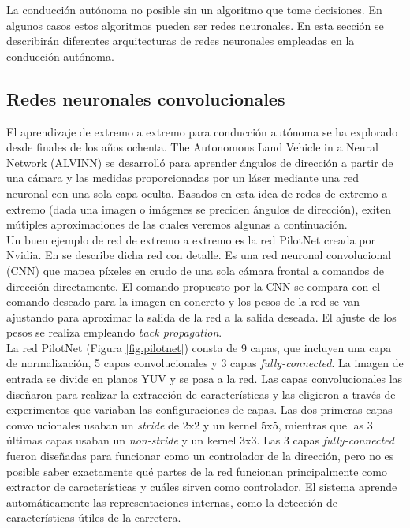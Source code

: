 La conducción autónoma no posible sin un algoritmo que tome decisiones. En algunos casos estos algoritmos pueden ser redes neuronales. En esta sección se describirán diferentes arquitecturas de redes neuronales empleadas en la conducción autónoma.


\subsection{Redes neuronales convolucionales}

El aprendizaje de extremo a extremo para conducción autónoma se ha explorado desde finales de los años ochenta. The Autonomous Land Vehicle in a Neural Network (ALVINN) \cite{alvinn} se desarrolló para aprender ángulos de dirección a partir de una cámara y las medidas proporcionadas por un láser mediante una red neuronal con una sola capa oculta. Basados en esta idea de redes de extremo a extremo (dada una imagen o imágenes se preciden ángulos de dirección), exiten mútiples aproximaciones \cite{road} \cite{end2end} \cite{interpretable} de las cuales veremos algunas a continuación.\\

Un buen ejemplo de red de extremo a extremo es la red PilotNet \cite{end2end} \cite{explaining-end2end} creada por Nvidia. En \cite{end2end} se describe dicha red con detalle. Es una red neuronal convolucional (CNN) que mapea píxeles en crudo de una sola cámara frontal a comandos de dirección directamente. El comando propuesto por la CNN se compara con el comando deseado para la imagen en concreto y los pesos de la red se van ajustando para aproximar la salida de la red a la salida deseada. El ajuste de los pesos se realiza empleando \textit{back propagation}.\\

La red PilotNet (Figura \ref{fig.pilotnet}) consta de 9 capas, que incluyen una capa de normalización, 5 capas convolucionales y 3 capas \textit{fully-connected}. La imagen de entrada se divide en planos YUV y se pasa a la red. Las capas convolucionales las diseñaron para realizar la extracción de características y las eligieron a través de experimentos que variaban las configuraciones de capas. Las dos primeras capas convolucionales usaban un \textit{stride} de 2x2 y un kernel 5x5, mientras que las 3 últimas capas usaban un \textit{non-stride} y un kernel 3x3. Las 3 capas \textit{fully-connected} fueron diseñadas para funcionar como un controlador de la dirección, pero no es posible saber exactamente qué partes de la red funcionan principalmente como extractor de características y cuáles sirven como controlador. El sistema aprende automáticamente las representaciones internas, como la detección de características útiles de la carretera.\\

